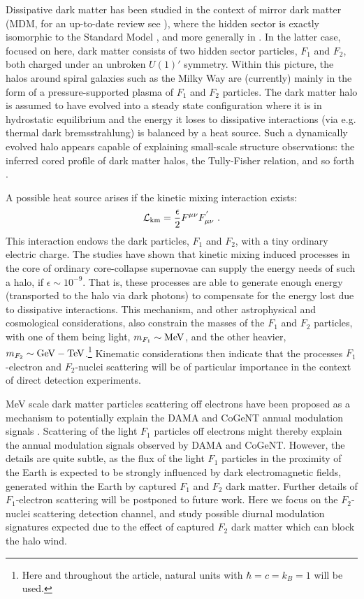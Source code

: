 \documentclass[12pt]{article}
\begin{document}
Dissipative dark matter has been studied in the context of mirror dark matter \cite{volkasspheroidal} (MDM, for an up-to-date review see \cite{review}), where the hidden sector is exactly isomorphic to the Standard Model \cite{footlewvolkas}, and more generally in \cite{dhsdm}. In the latter case, focused on here, dark matter consists of two hidden sector particles, $F_1$ and $F_2$, both charged under an unbroken $U(1)'$ symmetry. Within this picture, the halos around spiral galaxies such as the Milky Way are (currently) mainly in the form of a pressure-supported plasma of $F_1$ and $F_2$ particles. The dark matter halo is assumed to have evolved into a steady state configuration where it is in hydrostatic equilibrium and the energy it loses to dissipative interactions (via e.g. thermal dark bremsstrahlung) is balanced by a heat source. Such a dynamically evolved halo appears capable of explaining small-scale structure observations: the inferred cored profile of dark matter halos, the Tully-Fisher relation, and so forth \cite{dhsdm}.

A possible heat source arises if the kinetic mixing interaction exists:
%
\begin{eqnarray}
{\cal L} _{\text{km}} = \frac{\epsilon}{2}F ^{\mu \nu}F ^{'} _{\mu \nu} \ .
\end{eqnarray}
%
This interaction endows the dark particles, $F_1$ and $F_2$, with a tiny ordinary electric charge. The studies \cite{review,dhsdm} have shown that kinetic mixing induced processes in the core of ordinary core-collapse supernovae can supply the energy needs of such a halo, if $\epsilon \sim 10 ^{-9}$. That is, these processes are able to generate enough energy (transported to the halo via dark photons) to compensate for the energy lost due to dissipative interactions. This mechanism, and other astrophysical and cosmological considerations, also constrain the masses of the $F_1$ and $F_2$ particles, with one of them being light, $m _{F_1} \sim \rm MeV$, and the other heavier, $m _{F_2} \sim \rm GeV-TeV$.\footnote{Here and throughout the article, natural units with $\hbar = c = k _B = 1$ will be used.} Kinematic considerations then indicate that the processes $F_1$-electron and $F_2$-nuclei scattering will be of particular importance in the context of direct detection experiments.

MeV scale dark matter particles scattering off electrons have been proposed as a mechanism to potentially explain the DAMA \cite{dama} and CoGeNT \cite{cogent} annual modulation signals \cite{electron}. Scattering of the light $F_1$ particles off electrons might thereby explain the annual modulation signals observed by DAMA and CoGeNT. However, the details are quite subtle, as the flux of the light $F_1$ particles in the proximity of the Earth is expected to be strongly influenced by dark electromagnetic fields, generated within the Earth by captured $F_1$ and $F_2$ dark matter. Further details of $F_1$-electron scattering will be postponed to future work. Here we focus on the $F_2$-nuclei scattering detection channel, and study possible diurnal modulation signatures expected due to the effect of captured $F_2$ dark matter which can block the halo wind.
 
\end{document}

